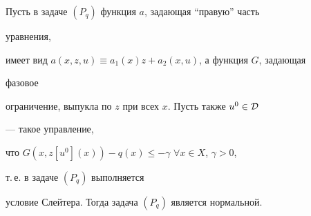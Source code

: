  


\begin{thms} 


Пусть в задаче $(P_q)$ функция $a$, задающая ``правую'' часть 


уравнения, 


имеет вид $a(x,z,u)\equiv a_1(x)z+a_2(x,u)$, а функция $G$, задающая 


фазовое 


ограничение, выпукла по $z$ при всех $x$. Пусть также $u^0\in\cal D$ 


--- такое управление, 


что $G(x,z[u^0](x))-q(x)\le-\gamma$ $\forall x\in X$, $\gamma>0$, 


т.\,е. в задаче $(P_q)$ выполняется 


условие Слейтера. Тогда задача $(P_q)$ является нормальной. 


\end{thms} 


 


